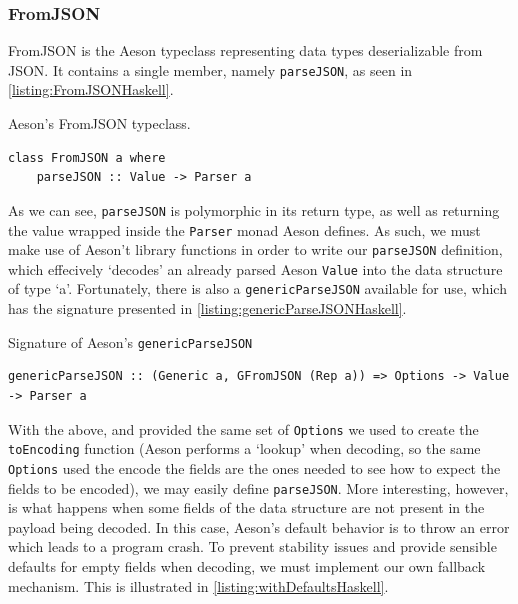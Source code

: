 \documentclass[11pt]{report}
\begin{document}
\subsubsection{FromJSON}

FromJSON is the Aeson typeclass representing data types deserializable from
JSON\@. It contains a single member, namely \texttt{parseJSON}, as seen in
\autoref{listing:FromJSONHaskell}.

\begin{listing}[H]
\caption{Aeson's FromJSON typeclass.}
\label{listing:FromJSONHaskell}
\begin{verbatim}
class FromJSON a where
    parseJSON :: Value -> Parser a
\end{verbatim}
\end{listing}

As we can see, \texttt{parseJSON} is polymorphic in its return type, as well as
returning the value wrapped inside the \texttt{Parser} monad Aeson defines. As
such, we must make use of Aeson't library functions in order to write our
\texttt{parseJSON} definition, which effecively `decodes' an already parsed
Aeson \texttt{Value} into the data structure of type `a'. Fortunately, there is
also a \texttt{genericParseJSON} available for use, which has the signature
presented in \autoref{listing:genericParseJSONHaskell}.

\begin{listing}[H]
    \caption{Signature of Aeson's \texttt{genericParseJSON}}
\label{listing:genericParseJSONHaskell}
\begin{verbatim}
genericParseJSON :: (Generic a, GFromJSON (Rep a)) => Options -> Value -> Parser a
\end{verbatim}
\end{listing}

With the above, and provided the same set of \texttt{Options} we used to create
the \texttt{toEncoding} function (Aeson performs a `lookup' when decoding, so
the same \texttt{Options} used the encode the fields are the ones needed to see
how to expect the fields to be encoded), we may easily define
\texttt{parseJSON}. \newline
More interesting, however, is what happens when some fields of the
data structure are not present in the payload being decoded. In this case,
Aeson's default behavior is to throw an error which leads to a program crash.
To prevent stability issues and provide sensible defaults for empty fields when
decoding, we must implement our own fallback mechanism. This is illustrated in
\autoref{listing:withDefaultsHaskell}.
\end{document}
